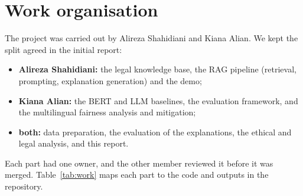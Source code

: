 \section{Work organisation}
\label{sec:work}

The project was carried out by Alireza Shahidiani and Kiana Alian. We kept the split agreed in the initial report:
\begin{itemize}
  \item \textbf{Alireza Shahidiani:} the legal knowledge base, the RAG pipeline (retrieval, prompting, explanation generation) and the demo;
  \item \textbf{Kiana Alian:} the BERT and LLM baselines, the evaluation framework, and the multilingual fairness analysis and mitigation;
  \item \textbf{both:} data preparation, the evaluation of the explanations, the ethical and legal analysis, and this report.
\end{itemize}
Each part had one owner, and the other member reviewed it before it was merged. Table~\ref{tab:work} maps each part to the code and outputs in the repository.

